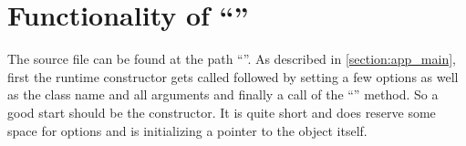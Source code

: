 \section{Functionality of ``''}
The source file can be found at the path ``''. As described in \autoref{section:app_main}, first the runtime constructor gets called followed by setting a few options as well as
the class name and all arguments and finally a call of the ``''
method. So a good start should be the constructor. It is quite short and
does reserve some space for options and is initializing a pointer to the object
itself.
